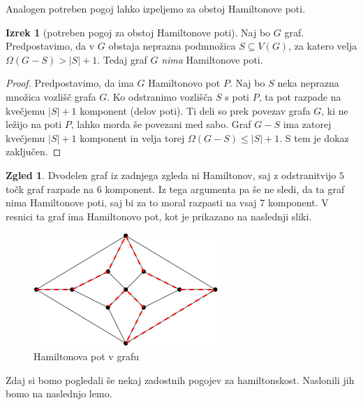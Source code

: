 \documentclass[11pt]{book}
\theoremstyle{definition}
\theoremstyle{zgled}
\newtheorem*{zgled}{Zgled}
\theoremstyle{odprtproblem}
\theoremstyle{domacanaloga}
\newenvironment{dokaz}
    {\color{siva}\begin{proof}}
    {\end{proof}}
\theoremstyle{izrek}
\newtheorem*{izrek}{Izrek}
\begin{document}
Analogen potreben pogoj lahko izpeljemo za obstoj Hamiltonove poti.

\begin{izrek}[potreben pogoj za obstoj Hamiltonove poti]
Naj bo $G$ graf. Predpostavimo, da v $G$ obstaja neprazna podmnožica $S \subseteq V(G)$, za katero velja $\Omega(G-S) > |S| + 1$. Tedaj graf $G$ \emph{nima} Hamiltonove poti.   
\end{izrek}
\begin{dokaz}
    Predpostavimo, da ima $G$ Hamiltonovo pot $P$. Naj bo $S$ neka neprazna množica vozlišč grafa $G$. Ko odstranimo vozlišča $S$ s poti $P$, ta pot razpade na kvečjemu $|S|+1$ komponent (delov poti). Ti deli so prek povezav grafa $G$, ki ne ležijo na poti $P$, lahko morda še povezani med sabo. Graf $G - S$ ima zatorej kvečjemu $|S| + 1$ komponent in velja torej $\Omega(G - S) \leq |S| + 1$. S tem je dokaz zaključen.
\end{dokaz}

\begin{zgled}
Dvodelen graf iz zadnjega zgleda ni Hamiltonov, saj z odstranitvijo $5$ točk graf razpade na $6$ komponent. Iz tega argumenta pa še ne sledi, da ta graf nima Hamiltonove poti, saj bi za to moral razpasti na vsaj $7$ komponent. V resnici ta graf ima Hamiltonovo pot, kot je prikazano na naslednji sliki. 

\begin{figure}[h]
    \centering
    \includegraphics[width=0.5\linewidth]{img/grafi-hamilton-zgled-pot.png}
    \caption{Hamiltonova pot v grafu}
\end{figure}  
\end{zgled}

Zdaj si bomo pogledali še nekaj zadostnih pogojev za hamiltonskost. Naslonili jih bomo na naslednjo lemo.
\end{document}

